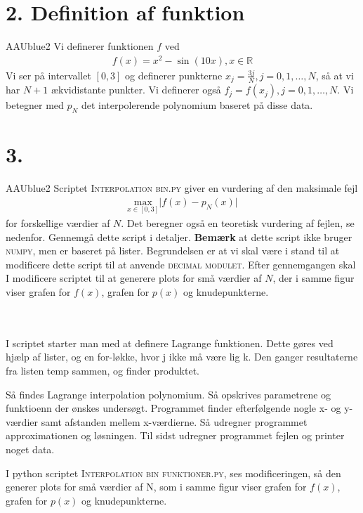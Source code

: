 \section*{2. Definition af funktion}
%
\begin{color}{AAUblue2} 
Vi definerer funktionen $f$ ved
\begin{align*}
f(x)=x^2-\sin(10x), x \in \mathbb{R}
\end{align*}
Vi ser på intervallet $\left [0,3 \right ]$ og definerer punkterne $x_j = \frac{3j}{N}, j = 0, 1, \ldots, N$, så at vi har $N+1$ ækvidistante punkter. Vi definerer også $f_j=f(x_j), j=0,1,\ldots,N.$ Vi betegner med $p_N$ det interpolerende polynomium baseret på disse data.  
\end{color}
%
\section*{3. }
%
\begin{color}{AAUblue2} 
Scriptet \textsc{Interpolation bin.py} giver en vurdering af den maksimale fejl 
\begin{align*}
\underset{x \in \left [0,3 \right ]}{\text{max}} \lvert f(x)-p_N(x) \rvert
\end{align*}
for forskellige værdier af $N$. Det beregner også en teoretisk vurdering af fejlen, se nedenfor. Gennemgå dette script i detaljer. \textbf{Bemærk} at dette script ikke bruger \textsc{numpy}, men er baseret på lister. Begrundelsen er at vi skal være i stand til at modificere dette script til at anvende \textsc{decimal modulet}. Efter gennemgangen skal I modificere scriptet til at generere plots for små værdier af $N$, der i samme figur viser grafen for $f(x)$, grafen for $p(x)$ og knudepunkterne.
% 
\end{color}
\\\\ 
%
I scriptet starter man med at definere Lagrange funktionen. Dette gøres ved hjælp af lister, og en for-løkke, hvor j ikke må være lig k. Den ganger resultaterne fra listen temp sammen, og finder produktet.

Så findes Lagrange interpolation polynomium. Så opskrives parametrene og funktioenn der ønskes undersøgt. Programmet finder efterfølgende nogle x- og y-værdier samt afstanden mellem x-værdierne. Så udregner programmet approximationen og løsningen. Til sidst udregner programmet fejlen og printer noget data. 

I python scriptet \textsc{Interpolation bin funktioner.py}, ses modificeringen, så den generer plots for små værdier af N, som i samme figur viser grafen for $f(x)$, grafen for $p(x)$ og knudepunkterne. 
%
%
%
%
%
%
